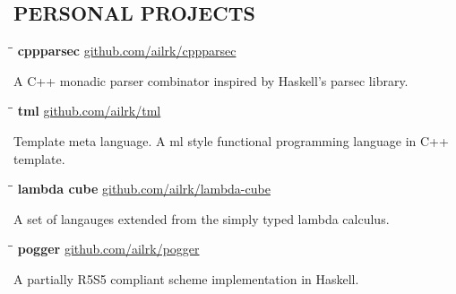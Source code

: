 \documentclass{res}
\begin{document}
\begin{resume}
\section{PERSONAL PROJECTS}

    \vspace{-0.1in}
    \begin{tabbing}
        \hspace{2.4in}\= \hspace{0.9in}\= \kill
        {\bf cppparsec } \>               \>\url{github.com/ailrk/cppparsec}\\

    \end{tabbing}\vspace{-30pt}
    A C++ monadic parser combinator inspired by Haskell's parsec library.

    \vspace{-0.2in}
    \begin{tabbing}
        \hspace{2.4in}\= \hspace{0.9in}\= \kill
        {\bf tml} \>               \>\url{github.com/ailrk/tml}\\

    \end{tabbing}\vspace{-30pt}
    Template meta language. A ml style functional programming language in C++ template.

    \vspace{-0.2in}
    \begin{tabbing}
        \hspace{2.4in}\= \hspace{0.9in}\= \kill
        {\bf lambda cube} \>               \>\url{github.com/ailrk/lambda-cube}\\

    \end{tabbing}\vspace{-30pt}
    A set of langauges extended from the simply typed lambda calculus.

    \vspace{-0.2in}
    \begin{tabbing}
        \hspace{2.4in}\= \hspace{0.9in}\= \kill
        {\bf pogger } \>               \>\url{github.com/ailrk/pogger}\\

    \end{tabbing}\vspace{-30pt}
    A partially R5S5 compliant scheme implementation in Haskell.


\end{resume}
\end{document}
